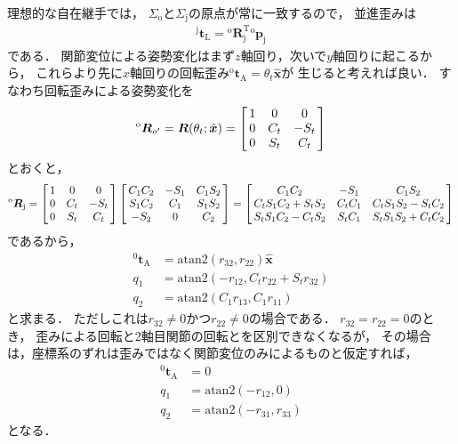 ﻿\documentclass[a4paper]{jsarticle}
\begin{document}
理想的な自在継手では，
$\Sigma_{\mathrm{o}}$と$\Sigma_{\mathrm{j}}$の原点が常に一致するので，
並進歪みは
\begin{align*}
{}^{\mathrm{j}}\bm{t}_{\mathrm{L}}={}^{\mathrm{o}}\bm{R}_{\mathrm{j}}^{\mathrm{T}}{}^{\mathrm{o}}\bm{p}_{\mathrm{j}}
\end{align*}
である．
関節変位による姿勢変化はまず$z$軸回り，次いで$y$軸回りに起こるから，
これらより先に$x$軸回りの回転歪み${}^{\mathrm{o}}\bm{t}_{\mathrm{A}}=\theta_{t}\hat{\bm{x}}$が
生じると考えれば良い．
すなわち回転歪みによる姿勢変化を
\begin{align*}
{}^{\mathrm{o}}\bm{R}_{o^{\prime}}=\bm{R}(\theta_{t};\hat{\bm{x}})
=\left[\begin{array}{@{\,}ccc@{\,}}
 1 & 0     & 0 \\
 0 & C_{t} &-S_{t} \\
 0 & S_{t} & C_{t} \\
\end{array}\right]
\end{align*}
とおくと，
\begin{align*}
{}^{\mathrm{o}}\bm{R}_{\mathrm{j}}
=\left[\begin{array}{@{\,}ccc@{\,}}
 1 & 0     & 0 \\
 0 & C_{t} &-S_{t} \\
 0 & S_{t} & C_{t} \\
\end{array}\right]\left[\begin{array}{@{\,}ccc@{\,}}
 C_{1}C_{2} &-S_{1} & C_{1}S_{2} \\
 S_{1}C_{2} & C_{1} & S_{1}S_{2} \\
     -S_{2} & 0     &      C_{2} \\
\end{array}\right]=\left[\begin{array}{@{\,}ccc@{\,}}
 C_{1}C_{2} &-S_{1} & C_{1}S_{2} \\
 C_{t}S_{1}C_{2}+S_{t}S_{2} & C_{t}C_{1} & C_{t}S_{1}S_{2}-S_{t}C_{2} \\
 S_{t}S_{1}C_{2}-C_{t}S_{2} & S_{t}C_{1} & S_{t}S_{1}S_{2}+C_{t}C_{2} \\
\end{array}\right]
\end{align*}
であるから，
\begin{align*}
{}^{0}\bm{t}_{\mathrm{A}}&=\mathrm{atan2}(r_{32},r_{22})\hat{\bm{x}} \\
q_{1}&=\mathrm{atan2}(-r_{12},C_{t}r_{22}+S_{t}r_{32}) \\
q_{2}&=\mathrm{atan2}(C_{1}r_{13},C_{1}r_{11})
\end{align*}
と求まる．
ただしこれは$r_{32}\neq 0$かつ$r_{22}\neq 0$の場合である．
$r_{32}=r_{22}=0$のとき，
歪みによる回転と2軸目関節の回転とを区別できなくなるが，
その場合は，座標系のずれは歪みではなく関節変位のみによるものと仮定すれば，
\begin{align*}
{}^{0}\bm{t}_{\mathrm{A}}&=0 \\
q_{1}&=\mathrm{atan2}(-r_{12},0) \\
q_{2}&=\mathrm{atan2}(-r_{31},r_{33})
\end{align*}
となる．
\end{document}
